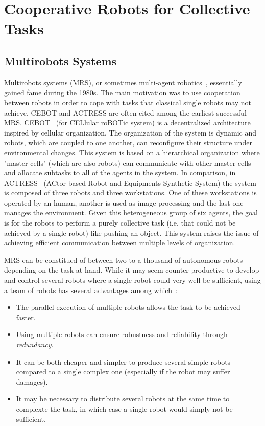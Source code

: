 \section{Cooperative Robots for Collective Tasks}

  \subsection{Multirobots Systems} 

    Multirobots systems (MRS), or sometimes multi-agent robotics~\parencite{Dudek1996}, essentially gained fame during the 1980s. The main motivation was to use cooperation between robots in order to cope with tasks that classical single robots may not achieve. CEBOT and ACTRESS are often cited among the earliest successful MRS. CEBOT~\parencite{Fukuda1988} (for CELlular roBOTic system) is a decentralized architecture inspired by cellular organization. The organization of the system is dynamic and robots, which are coupled to one another, can reconfigure their structure under environmental changes. This system is based on a hierarchical organization where "master cells" (which are also robots) can communicate with other master cells and allocate subtasks to all of the agents in the system. In comparison, in ACTRESS~\parencite{Asama1989} (ACtor-based Robot and Equipments Synthetic System) the system is composed of three robots and three workstations. One of these workstations is operated by an human, another is used as image processing and the last one manages the environment. Given this heterogeneous group of six agents, the goal is for the robots to perform a purely collective task (i.e. that could not be achieved by a single robot) like pushing an object. This system raises the issue of achieving efficient communication between multiple levels of organization.

    MRS can be constitued of between two to a thousand of autonomous robots~\parencite{Rubenstein2014} depending on the task at hand. While it may seem counter-productive to develop and control several robots where a single robot could very well be sufficient, using a team of robots has several advantages among which~\parencite{Cao1997, Arkin1998}:

    \begin{itemize}
      \item{The parallel execution of multiple robots allows the task to be achieved faster.}
      \item{Using multiple robots can ensure robustness and reliability through \emph{redundancy}.}
      \item{It can be both cheaper and simpler to produce several simple robots compared to a single complex one (especially if the robot may suffer damages).}
      \item{It may be necessary to distribute several robots at the same time to complexte the task, in which case a single robot would simply not be sufficient.}
    \end{itemize}

